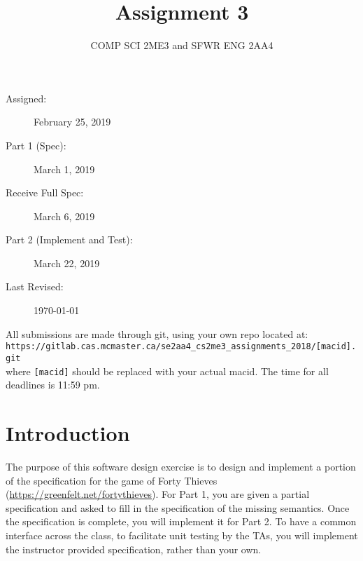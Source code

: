 \documentclass[12pt]{article}
\title{Assignment 3}
\author{COMP SCI 2ME3 and SFWR ENG 2AA4}
\begin{document}
\maketitle

\begin{description}
\item [Assigned:] February 25, 2019
\item [Part 1 (Spec):]  March 1, 2019
\item [Receive Full Spec:] March 6, 2019
\item [Part 2 (Implement and Test):] March 22, 2019
\item [Last Revised:] \today
\end{description}

\noindent All submissions are made through git, using your own repo located at:\\

\texttt{https://gitlab.cas.mcmaster.ca/se2aa4\_cs2me3\_assignments\_2018/[macid].git}\\

\noindent where \texttt{[macid]} should be replaced with your actual macid.  The
time for all deadlines is 11:59 pm.  

\section{Introduction}

The purpose of this software design exercise is to design and implement a
portion of the specification for the game of Forty Thieves
(\url{https://greenfelt.net/fortythieves}).  For Part 1, you are given a partial
specification and asked to fill in the specification of the missing semantics.
Once the specification is complete, you will implement it for Part 2.  To have a
common interface across the class, to facilitate unit testing by the TAs, you
will implement the instructor provided specification, rather than your own.
\end{document}
